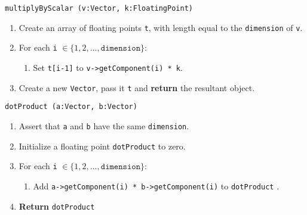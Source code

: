 \vspace{5mm}
\texttt{multiplyByScalar (v:Vector, k:FloatingPoint)}
\begin{enumerate}
	\item Create an array of floating points \texttt{t}, with length equal to the \texttt{dimension} of \texttt{v}.
	\item For each \texttt{i}  $\in \{1, 2, \dots, \mathtt{dimension}\}$:
	\begin{enumerate}
		\item Set \texttt{t[i-1]} to \texttt{v->getComponent(i) * k}.
	\end{enumerate}
	\item Create a new \texttt{Vector}, pass it \texttt{t} and \textbf{return} the resultant object. 
\end{enumerate}
\vspace{5mm}
\texttt{dotProduct (a:Vector, b:Vector)}
\begin{enumerate}
	\item Assert that \texttt{a} and \texttt{b} have the same \texttt{dimension}. 
	\item Initialize a floating point \texttt{dotProduct} to zero. 
	\item For each \texttt{i}  $\in \{1, 2, \dots, \mathtt{dimension}\}$:
	\begin{enumerate}
		\item Add \texttt{a->getComponent(i) * b->getComponent(i)} to \texttt{dotProduct} . 
	\end{enumerate}
	\item \textbf{Return} \texttt{dotProduct} 
\end{enumerate}

\sourcecode



